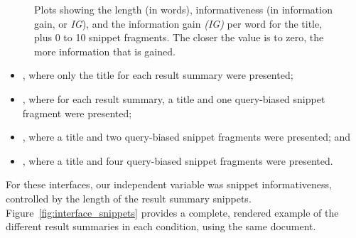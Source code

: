 \begin{figure}[t!]
    \centering
    \caption[Information gain plots]{Plots showing the length (in words), informativeness (in information gain, or \emph{IG}), and the information gain \emph{(IG)} per word for the title, plus 0 to 10 snippet fragments. The closer the value is to zero, the more information that is gained.}
    \label{fig:ig_plots}
\end{figure}

\begin{itemize}
    \item{, where only the title for each result summary were presented;}
    \item{, where for each result summary, a title and one query-biased snippet fragment were presented;}
    \item{, where a title and two query-biased snippet fragments were presented; and}
    \item{, where a title and four query-biased snippet fragments were presented.}
\end{itemize}

For these interfaces, our independent variable was snippet informativeness, controlled by the length of the result summary snippets. Figure~\ref{fig:interface_snippets} provides a complete, rendered example of the different result summaries in each condition, using the same document.

